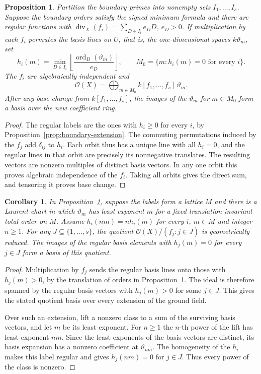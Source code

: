 \documentclass[11pt,reqno]{amsart}
\numberwithin{equation}{section}
\newtheorem{proposition}[theorem]{Proposition}
\newtheorem{boundarycorollary}{Corollary}[theorem]
\theoremstyle{definition}
\theoremstyle{remark}
\DeclareMathOperator{\ord}{ord}
\begin{document}
\begin{proposition}\label{prop:polynomial-frozen-basis}
Partition the boundary primes into nonempty sets \(I_1,\ldots,I_s\).
Suppose the boundary orders satisfy the signed minimum formula and
there are regular functions with
\(\operatorname{div}_X(f_i)=\sum_{D\in I_i}e_DD\), \(e_D>0\).
If multiplication by each \(f_i\) permutes the basis lines on \(U\),
that is, the one-dimensional spaces \(k\vartheta_m\),
set
\[ h_i(m)=\min_{D\in I_i} \left\lfloor\frac{\ord_D(\vartheta_m)}{e_D}\right\rfloor, \qquad M_0=\{m:h_i(m)=0\text{ for every }i\}. \]
The \(f_i\) are algebraically independent and
\[ \mathcal O(X)=\bigoplus_{m\in M_0}k[f_1,\ldots,f_s]\,\vartheta_m . \]
After any base change from \(k[f_1,\ldots,f_s]\), the images of the
\(\vartheta_m\) for \(m\in M_0\) form a basis over the new coefficient ring.
\end{proposition}
\begin{proof}
The regular labels are the ones with \(h_i\ge0\) for every \(i\), by
Proposition~\ref{prop:boundary-extension}. The commuting permutations induced
by the \(f_j\) add \(\delta_{ij}\) to \(h_i\). Each orbit thus has
a unique line with all \(h_i=0\), and the regular lines in that orbit
are precisely its nonnegative translates. The resulting vectors are
nonzero multiples of distinct basis vectors. In any one orbit this
proves algebraic independence of the \(f_i\). Taking all orbits
gives the direct sum, and tensoring it proves base change.
\end{proof}

\begin{boundarycorollary}\label{cor:coordinate-boundary-reduced}
In Proposition~\ref{prop:polynomial-frozen-basis}, suppose the labels
form a lattice \(M\) and there is a Laurent chart in which
\(\vartheta_m\) has least exponent \(m\) for a fixed translation-invariant
total order on \(M\). Assume \(h_i(nm)=nh_i(m)\) for every \(i\),
\(m\in M\) and integer \(n\ge1\). For any \(J\subseteq\{1,\ldots,s\}\),
the quotient \(\mathcal O(X)/(f_j:j\in J)\) is geometrically reduced.
The images of the regular basis elements with \(h_j(m)=0\) for every
\(j\in J\) form a basis of this quotient.
\end{boundarycorollary}
\begin{proof}
Multiplication by \(f_j\) sends the regular basis lines onto those
with \(h_j(m)>0\), by the translation of orders in
Proposition~\ref{prop:polynomial-frozen-basis}. The ideal is therefore
spanned by the regular basis vectors with \(h_j(m)>0\) for some
\(j\in J\). This gives the stated quotient basis over every extension
of the ground field.

Over such an extension, lift a nonzero class to a sum of the
surviving basis vectors, and let \(m\) be its least exponent.
For \(n\ge1\) the \(n\)-th power of the lift has least exponent \(nm\).
Since the least exponents of the basis vectors are distinct, its
basis expansion has a nonzero coefficient at \(\vartheta_{nm}\).
The homogeneity of the \(h_i\) makes this label regular and gives
\(h_j(nm)=0\) for \(j\in J\). Thus every power of the class is nonzero.
\end{proof}
\end{document}
